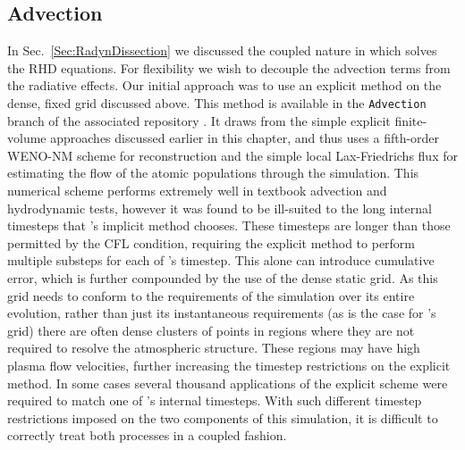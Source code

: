 \subsection{Advection}


In Sec.~\ref{Sec:RadynDissection} we discussed the coupled nature in which \Radyn{} solves the RHD equations.
For flexibility we wish to decouple the advection terms from the radiative effects.
Our initial approach was to use an explicit method on the dense, fixed grid discussed above.
This method is available in the \texttt{Advection} branch of the associated repository \NeedRef{}.
It draws from the simple explicit finite-volume approaches discussed earlier in this chapter, and thus uses a fifth-order WENO-NM scheme for reconstruction and the simple local Lax-Friedrichs flux for estimating the flow of the atomic populations through the simulation.
This numerical scheme performs extremely well in textbook advection and hydrodynamic tests, however it was found to be ill-suited to the long internal timesteps that \Radyn{}'s implicit method chooses.
These timesteps are longer than those permitted by the CFL condition, requiring the explicit method to perform multiple substeps for each of \Radyn{}'s timestep.
This alone can introduce cumulative error, which is further compounded by the use of the dense static grid.
As this grid needs to conform to the requirements of the simulation over its entire evolution, rather than just its instantaneous requirements (as is the case for \Radyn{}'s grid) there are often dense clusters of points in regions where they are not required to resolve the atmospheric structure.
These regions may have high plasma flow velocities, further increasing the timestep restrictions on the explicit method.
In some cases several thousand applications of the explicit scheme were required to match one of \Radyn{}'s internal timesteps.
With such different timestep restrictions imposed on the two components of this simulation, it is difficult to correctly treat both processes in a coupled fashion.

